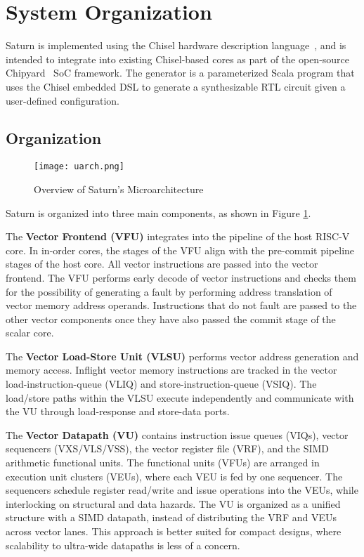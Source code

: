 \newpage
\section{System Organization}
\label{sec:system}

Saturn is implemented using the Chisel hardware description language~\cite{chisel_paper}, and is intended to integrate into existing Chisel-based cores as part of the open-source Chipyard~\cite{chipyard} SoC framework.
The generator is a parameterized Scala program that uses the Chisel embedded DSL to generate a synthesizable RTL circuit given a user-defined configuration.

\subsection{Organization}


\begin{figure}[h]
  \centering
  \texttt{[image: uarch.png]}
  \caption{Overview of Saturn's Microarchitecture}
  \label{fig:overview}
\end{figure}

Saturn is organized into three main components, as shown in Figure \ref{fig:overview}.

The \textbf{Vector Frontend (VFU)} integrates into the pipeline of the host RISC-V core.
In in-order cores, the stages of the VFU align with the pre-commit pipeline stages of the host core.
All vector instructions are passed into the vector frontend.
The VFU performs early decode of vector instructions and checks them for the possibility of generating a fault by performing address translation of vector memory address operands.
Instructions that do not fault are passed to the other vector components once they have also passed the commit stage of the scalar core.

The \textbf{Vector Load-Store Unit (VLSU)} performs vector address generation and memory access.
Inflight vector memory instructions are tracked in the vector load-instruction-queue (VLIQ) and store-instruction-queue (VSIQ).
The load/store paths within the VLSU execute independently and communicate with the VU through load-response and store-data ports.

The \textbf{Vector Datapath (VU)} contains instruction issue queues (VIQs), vector sequencers (VXS/VLS/VSS), the vector register file (VRF), and the SIMD arithmetic functional units.
The functional units (VFUs) are arranged in execution unit clusters (VEUs), where each VEU is fed by one sequencer.
The sequencers schedule register read/write and issue operations into the VEUs, while interlocking on structural and data hazards.
The VU is organized as a unified structure with a SIMD datapath, instead of distributing the VRF and VEUs across vector lanes.
This approach is better suited for compact designs, where scalability to ultra-wide datapaths is less of a concern.


